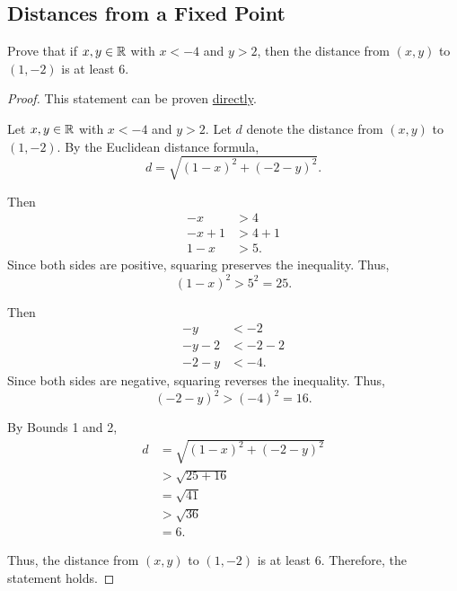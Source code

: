 \subsection{Distances from a Fixed Point}
\label{subsections:examples:example2}



\begin{exercise}{
    Prove that if $x, y \in \mathbb{R}$ with $x < -4$ and $y > 2$, %
    then the distance from $(x, y)$ to $(1, -2)$ is at least $6$.
}
\end{exercise}



\begin{proof}{
    This statement can be proven %
    \hyperref[subsections:techniques:universal:direct]{directly}.

    \begin{panel}[Setup.]{
        Let $x, y \in \mathbb{R}$ with $x < -4$ and $y > 2$. %
        Let $d$ denote the distance from $(x, y)$ to $(1, -2)$. %
        By the Euclidean distance formula, %
        \[
            d = \sqrt{(1 - x)^2 + (-2 - y)^2}.
        \]
    }
    \end{panel}

    \begin{panel}{
        Then %
        \begin{align*}
                   -x &> 4\\
               -x + 1 &> 4 + 1\\
                1 - x &> 5.
        \end{align*}
        Since both sides are positive, squaring preserves the inequality. %
        Thus, %
        \[
            (1 - x)^2 > 5^2 = 25.
        \]
    }
    \end{panel}

    \begin{panel}{
        Then %
        \begin{align*}
                    -y &< -2\\
                -y - 2 &< -2 - 2\\
                -2 - y &< -4.
        \end{align*}
        Since both sides are negative, squaring reverses the inequality. %
        Thus, %
        \[
            (-2 - y)^2 > (-4)^2 = 16.
        \]
    }
    \end{panel}

    \begin{panel}{
        By Bounds 1 and 2, %
        \begin{align*}
            d &= \sqrt{(1 - x)^2 + (-2 - y)^2}\\
              &> \sqrt{25 + 16}\\
              &= \sqrt{41}\\
              &> \sqrt{36}\\
              &= 6.
        \end{align*}
    }
    \end{panel}

    Thus, the distance from $(x, y)$ to $(1, -2)$ is at least $6$. %
    Therefore, the statement holds.
}
\end{proof}